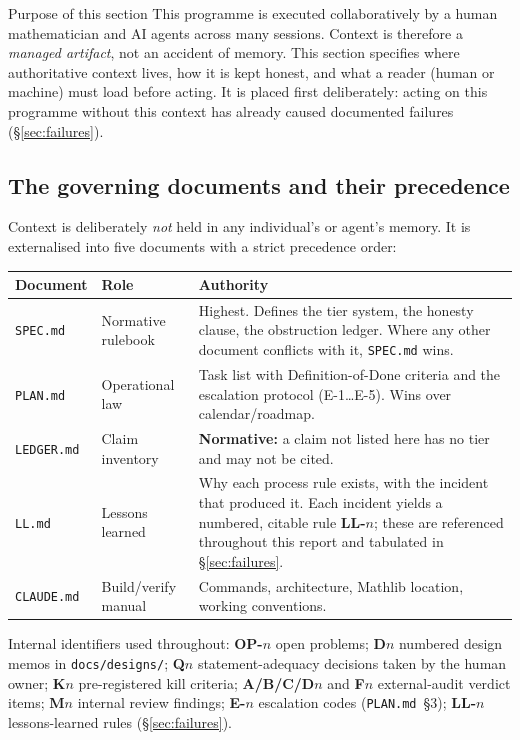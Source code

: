 \documentclass[11pt,a4paper]{article}
\theoremstyle{definition}
\theoremstyle{plain}
\begin{document}
\begin{keybox}{Purpose of this section}
This programme is executed collaboratively by a human mathematician and AI agents across
many sessions. Context is therefore a \emph{managed artifact}, not an accident of memory.
This section specifies where authoritative context lives, how it is kept honest, and what a
reader (human or machine) must load before acting. It is placed first deliberately: acting on
this programme without this context has already caused documented failures (\S\ref{sec:failures}).
\end{keybox}

\subsection{The governing documents and their precedence}

Context is deliberately \emph{not} held in any individual's or agent's memory. It is
externalised into five documents with a strict precedence order:

\begin{center}
\begin{tabular}{@{}p{2.9cm}p{4.1cm}p{7.4cm}@{}}
\toprule
\textbf{Document} & \textbf{Role} & \textbf{Authority} \\
\midrule
\texttt{SPEC.md} & Normative rulebook & Highest. Defines the tier system, the honesty clause, the obstruction ledger. Where any other document conflicts with it, \texttt{SPEC.md} wins. \\
\texttt{PLAN.md} & Operational law & Task list with Definition-of-Done criteria and the escalation protocol (E-1\ldots E-5). Wins over calendar/roadmap. \\
\texttt{LEDGER.md} & Claim inventory & \textbf{Normative:} a claim not listed here has no tier and may not be cited. \\
\texttt{LL.md} & Lessons learned & Why each process rule exists, with the incident that produced it. Each incident yields a numbered, citable rule \textbf{LL-$n$}; these are referenced throughout this report and tabulated in \S\ref{sec:failures}. \\
\texttt{CLAUDE.md} & Build/verify manual & Commands, architecture, Mathlib location, working conventions. \\
\bottomrule
\end{tabular}
\end{center}

Internal identifiers used throughout: \textbf{OP-$n$} open problems; \textbf{D$n$} numbered
design memos in \texttt{docs/designs/}; \textbf{Q$n$} statement-adequacy decisions taken by the
human owner; \textbf{K$n$} pre-registered kill criteria; \textbf{A/B/C/D$n$} and \textbf{F$n$}
external-audit verdict items; \textbf{M$n$} internal review findings; \textbf{E-$n$} escalation
codes (\texttt{PLAN.md}~\S3); \textbf{LL-$n$} lessons-learned rules (\S\ref{sec:failures}).
\end{document}
